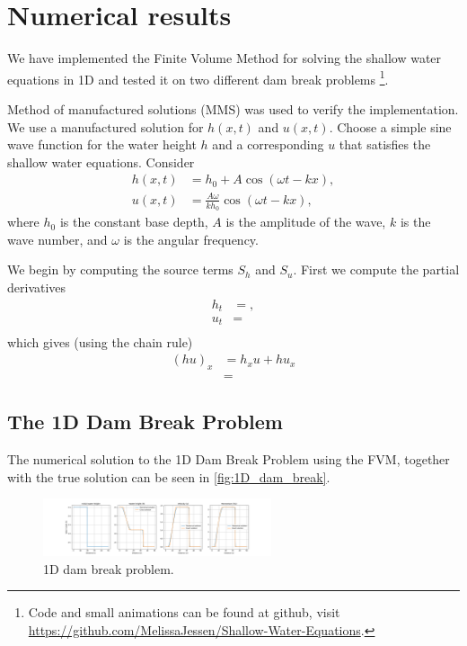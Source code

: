\chapter{Numerical results}
We have implemented the Finite Volume Method for solving the shallow water equations in 1D and tested it on two different dam break problems
\footnote{Code and small animations can be found at github, visit \url{https://github.com/MelissaJessen/Shallow-Water-Equations}.}.

Method of manufactured solutions (MMS) was used to verify the implementation.
We use a manufactured solution for $h(x,t)$ and $u(x,t)$.
Choose a simple sine wave function for the water height $h$ and a corresponding $u$ that satisfies the shallow water equations.
Consider
\begin{align*}
    h(x,t) &= h_0 + A \cos(\omega t - kx), \\
    u(x,t) &= \frac{ A \omega }{k h_0}  \cos(\omega t - kx),
\end{align*} 
where $h_0$ is the constant base depth, $A$ is the amplitude of the wave, $k$ is the wave number, and $\omega$ is the angular frequency.

We begin by computing the source terms $S_h$ and $S_u$.
First we compute the partial derivatives
\begin{align*}
    h_t &= ,\\
    u_t &=  \\
\end{align*}
which gives (using the chain rule)
\begin{align*}
    {(hu)}_x &= h_x u + h u_x \\
    &= 
\end{align*}

\section{The 1D Dam Break Problem}
The numerical solution to the 1D Dam Break Problem using the FVM, together with the true solution can be seen in \autoref{fig:1D_dam_break}.


\begin{figure}[H]
    \centering
    \includegraphics[width=0.6\textwidth]{plots/sol_1D_val.png}
    \caption{1D dam break problem.}\label{fig:1D_dam_break}
\end{figure}


